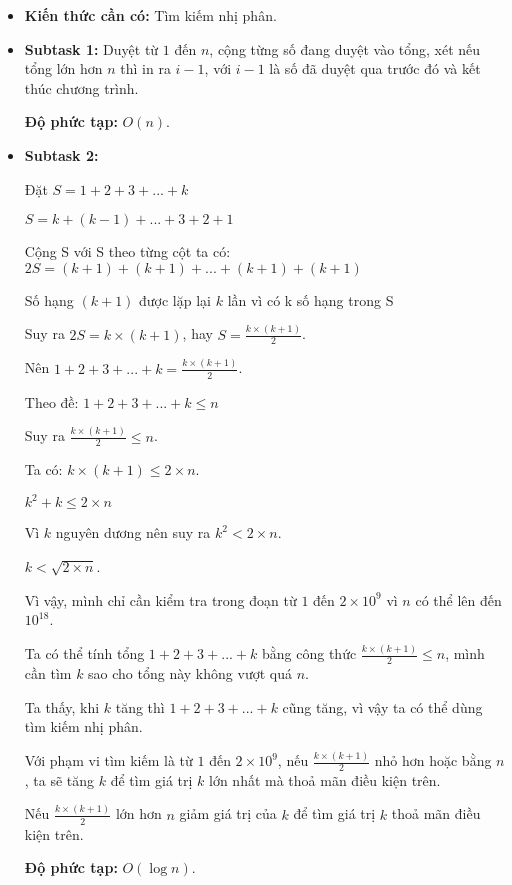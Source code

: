 \documentclass[12pt]{scrartcl}  %
\begin{document}
\begin{itemize}
    \item \textbf{Kiến thức cần có:} Tìm kiếm nhị phân.
    \item \textbf{Subtask 1:} Duyệt từ $1$ đến $n$, cộng từng số đang duyệt vào tổng, xét nếu tổng
    lớn hơn $n$ thì in ra $i - 1$, với $i - 1$ là số đã duyệt qua trước đó và kết thúc chương trình.

    \textbf{Độ phức tạp:} $O(n)$.
    \item \textbf{Subtask 2:}
    

    Đặt $S = 1 + 2 + 3 + ... + k$

    $S = k + (k - 1) + ... + 3 + 2 + 1$
    
    Cộng S với S theo từng cột ta có: $2S = (k + 1) + (k + 1) + ... + (k + 1) + (k + 1)$

    Số hạng $(k + 1)$ được lặp lại $k$ lần vì có k số hạng trong S

    Suy ra $2S = k \times (k + 1)$, hay $S = \frac{k \times (k + 1)}{2}$.

    Nên $1 + 2 + 3 + ... + k = \frac{k \times (k + 1)}{2}$.

    Theo đề: $1 + 2 + 3 + ... + k \leq n$

    Suy ra $\frac{k \times (k + 1)}{2} \leq n$.

    Ta có: $k \times (k + 1) \leq 2 \times n$.

    $k^2 + k \leq 2 \times n$

    Vì $k$ nguyên dương nên suy ra $k^2 < 2 \times n$.
    
    $k < \sqrt{2 \times n}$.

    Vì vậy, mình chỉ cần kiểm tra trong đoạn từ $1$ đến $2 \times 10^9$ vì $n$ có thể lên đến $10^{18}$.

    Ta có thể tính tổng $1 + 2 + 3 + ... + k$ bằng công thức $\frac{k \times (k + 1)}{2} \leq n$,
    mình cần tìm $k$ sao cho tổng này không vượt quá $n$.

    Ta thấy, khi $k$ tăng thì $1 + 2 + 3 + ... + k$ cũng tăng, vì vậy ta có thể dùng tìm kiếm nhị phân.

    Với phạm vi tìm kiếm là từ $1$ đến $2 \times 10^{9}$, nếu $\frac{k \times (k + 1)}{2}$ nhỏ hơn hoặc bằng
    $n$, ta sẽ tăng $k$ để tìm giá trị $k$ lớn nhất mà thoả mãn điều kiện trên.
        
    Nếu $\frac{k \times (k + 1)}{2}$ lớn hơn $n$
    giảm giá trị của $k$ để tìm giá trị $k$ thoả mãn điều kiện trên.

    \textbf{Độ phức tạp:} $O(\log n)$.

\end{itemize}
\end{document}
